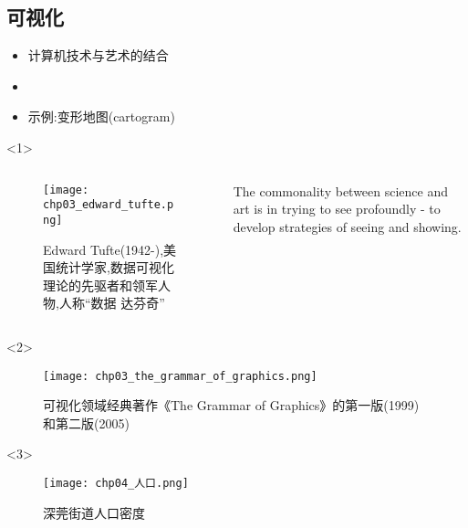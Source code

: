 \subsection{可视化}
\begin{frame}[t]{\subsecname}
\begin{itemize}
\item<1-> 计算机技术与艺术的结合
\item<2-> 
\item<3-> 示例:变形地图(cartogram)
\end{itemize}

\begin{overlayarea}{\textwidth}{\textheight}
  \begin{onlyenv}<1>
  \begin{columns}
    \begin{column}{.4\textwidth}
      \begin{figure}
        \centering \texttt{[image: chp03\_edward\_tufte.png]}
        \caption{\scriptsize Edward Tufte(1942-),美国统计学家,数据可视化理论的先驱者和领军人物,人称“数据
    达芬奇”}
      \end{figure}
    \end{column}

    \begin{column}{.6\textwidth}
  \begin{ornamentblock}
    {The commonality between science and art is in trying to see profoundly - to develop strategies of seeing and showing.\\
      }
  \end{ornamentblock}
    \end{column}
  \end{columns}
  \end{onlyenv}

\vspace{-10pt}
  \begin{onlyenv}<2>
\begin{figure}[ht]
  \centering
  \texttt{[image: chp03\_the\_grammar\_of\_graphics.png]}
  \caption{可视化领域经典著作《The Grammar of Graphics》的第一版(1999)和第二版(2005)}
\end{figure}
  \end{onlyenv}

\vspace{-10pt}
  \begin{onlyenv}<3>
\begin{figure}
  \centering
  \texttt{[image: chp04\_人口.png]}
  \caption{深莞街道人口密度}
\end{figure}
  \end{onlyenv}


\end{overlayarea}
\end{frame}

